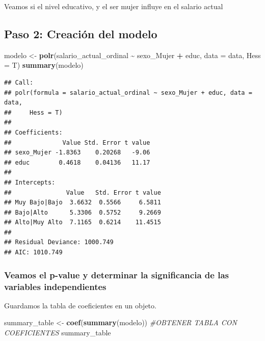 \documentclass[
]{article}
\newenvironment{Shaded}{\begin{snugshade}}{\end{snugshade}}
\newcommand{\AttributeTok}[1]{\textcolor[rgb]{0.13,0.29,0.53}{#1}}
\newcommand{\CommentTok}[1]{\textcolor[rgb]{0.56,0.35,0.01}{\textit{#1}}}
\newcommand{\FunctionTok}[1]{\textcolor[rgb]{0.13,0.29,0.53}{\textbf{#1}}}
\newcommand{\NormalTok}[1]{#1}
\newcommand{\OtherTok}[1]{\textcolor[rgb]{0.56,0.35,0.01}{#1}}
\newcommand{\SpecialCharTok}[1]{\textcolor[rgb]{0.81,0.36,0.00}{\textbf{#1}}}
\begin{document}
Veamos si el nivel educativo, y el ser mujer influye en el salario
actual

\hypertarget{paso-2-creaciuxf3n-del-modelo}{%
\subsection{\texorpdfstring{\textbf{Paso 2: Creación del
modelo}}{Paso 2: Creación del modelo}}\label{paso-2-creaciuxf3n-del-modelo}}

\begin{Shaded}
\begin{Highlighting}[]
\NormalTok{modelo }\OtherTok{\textless{}{-}} \FunctionTok{polr}\NormalTok{(salario\_actual\_ordinal }\SpecialCharTok{\textasciitilde{}}\NormalTok{ sexo\_Mujer }\SpecialCharTok{+}\NormalTok{ educ, }\AttributeTok{data =}\NormalTok{ data, }\AttributeTok{Hess =}\NormalTok{ T)}
\FunctionTok{summary}\NormalTok{(modelo)}
\end{Highlighting}
\end{Shaded}

\begin{verbatim}
## Call:
## polr(formula = salario_actual_ordinal ~ sexo_Mujer + educ, data = data, 
##     Hess = T)
## 
## Coefficients:
##              Value Std. Error t value
## sexo_Mujer -1.8363    0.20268   -9.06
## educ        0.4618    0.04136   11.17
## 
## Intercepts:
##               Value   Std. Error t value
## Muy Bajo|Bajo  3.6632  0.5566     6.5811
## Bajo|Alto      5.3306  0.5752     9.2669
## Alto|Muy Alto  7.1165  0.6214    11.4515
## 
## Residual Deviance: 1000.749 
## AIC: 1010.749
\end{verbatim}

\hypertarget{veamos-el-p-value-y-determinar-la-significancia-de-las-variables-independientes}{%
\subsubsection{Veamos el p-value y determinar la significancia de las
variables
independientes}\label{veamos-el-p-value-y-determinar-la-significancia-de-las-variables-independientes}}

Guardamos la tabla de coeficientes en un objeto.

\begin{Shaded}
\begin{Highlighting}[]
\NormalTok{summary\_table }\OtherTok{\textless{}{-}} \FunctionTok{coef}\NormalTok{(}\FunctionTok{summary}\NormalTok{(modelo)) }\CommentTok{\#OBTENER TABLA CON COEFICIENTES}
\NormalTok{summary\_table}
\end{Highlighting}
\end{Shaded}
\end{document}
